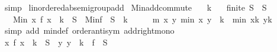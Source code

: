 \begin{isabellebody}
\ simp%
\endisatagproof
{\isafoldproof}%
%
\isadelimproof
\isanewline
%
\endisadelimproof
\isanewline
{}\isamarkupfalse%
\ linordered{\isacharunderscore}{\kern0pt}ab{\isacharunderscore}{\kern0pt}semigroup{\isacharunderscore}{\kern0pt}add\isanewline
{}\isanewline
\isanewline
{}\isamarkupfalse%
\ Min{\isacharunderscore}{\kern0pt}add{\isacharunderscore}{\kern0pt}commute{\isacharcolon}{\kern0pt}\isanewline
\ \ \ k\isanewline
\ \ \ {\isachardoublequoteopen}finite\ S{\isachardoublequoteclose}\ \ {\isachardoublequoteopen}S\ {\isasymnoteq}\ {\isacharbraceleft}{\kern0pt}{\isacharbraceright}{\kern0pt}{\isachardoublequoteclose}\isanewline
\ \ \ {\isachardoublequoteopen}Min\ {\isacharparenleft}{\kern0pt}{\isacharparenleft}{\kern0pt}{\isasymlambda}x{\isachardot}{\kern0pt}\ f\ x\ {\isacharplus}{\kern0pt}\ k{\isacharparenright}{\kern0pt}\ {\isacharbackquote}{\kern0pt}\ S{\isacharparenright}{\kern0pt}\ {\isacharequal}{\kern0pt}\ Min{\isacharparenleft}{\kern0pt}f\ {\isacharbackquote}{\kern0pt}\ S{\isacharparenright}{\kern0pt}\ {\isacharplus}{\kern0pt}\ k{\isachardoublequoteclose}\isanewline
%
\isadelimproof
%
\endisadelimproof
%
\isatagproof
{}\isamarkupfalse%
\ {\isacharminus}{\kern0pt}\isanewline
\ \ \isamarkupfalse%
\ m{\isacharcolon}{\kern0pt}\ {\isachardoublequoteopen}{\isasymAnd}x\ y{\isachardot}{\kern0pt}\ min\ x\ y\ {\isacharplus}{\kern0pt}\ k\ {\isacharequal}{\kern0pt}\ min\ {\isacharparenleft}{\kern0pt}x{\isacharplus}{\kern0pt}k{\isacharparenright}{\kern0pt}\ {\isacharparenleft}{\kern0pt}y{\isacharplus}{\kern0pt}k{\isacharparenright}{\kern0pt}{\isachardoublequoteclose}\isanewline
\ \ \ \ \isamarkupfalse%
\ {\isacharparenleft}{\kern0pt}simp\ add{\isacharcolon}{\kern0pt}\ min{\isacharunderscore}{\kern0pt}def\ order{\isachardot}{\kern0pt}antisym\ add{\isacharunderscore}{\kern0pt}right{\isacharunderscore}{\kern0pt}mono{\isacharparenright}{\kern0pt}\isanewline
\ \ \isamarkupfalse%
\ {\isachardoublequoteopen}{\isacharparenleft}{\kern0pt}{\isasymlambda}x{\isachardot}{\kern0pt}\ f\ x\ {\isacharplus}{\kern0pt}\ k{\isacharparenright}{\kern0pt}\ {\isacharbackquote}{\kern0pt}\ S\ {\isacharequal}{\kern0pt}\ {\isacharparenleft}{\kern0pt}{\isasymlambda}y{\isachardot}{\kern0pt}\ y\ {\isacharplus}{\kern0pt}\ k{\isacharparenright}{\kern0pt}\ {\isacharbackquote}{\kern0pt}\ {\isacharparenleft}{\kern0pt}f\ {\isacharbackquote}{\kern0pt}\ S{\isacharparenright}{\kern0pt}{\isachardoublequoteclose}\ \isamarkupfalse%

\end{isabellebody}

